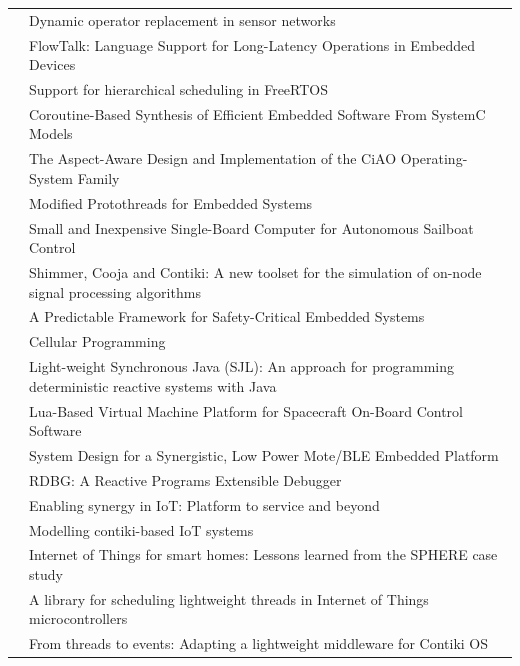 \documentclass[format=acmsmall, review=false, screen=false]{acmart}
\begin{document}
\begin{longtable}[c]{ l p{8cm} }
\cite{Strube2010} & Dynamic operator replacement in sensor networks \\
\cite{Bergel2011} & FlowTalk: Language Support for Long-Latency Operations in Embedded Devices \\
\cite{Inam2011} & Support for hierarchical scheduling in FreeRTOS \\
\cite{Liu2011} & Coroutine-Based Synthesis of Efficient Embedded Software From SystemC Models \\
\cite{Lohmann2012} & The Aspect-Aware Design and Implementation of the CiAO Operating-System Family \\
\cite{Schimpf2012b} & Modified Protothreads for Embedded Systems \\
\cite{Alvira2013} & Small and Inexpensive Single-Board Computer for Autonomous Sailboat Control \\
\cite{Kugler2013} & Shimmer, Cooja and Contiki: A new toolset for the simulation of on-node signal processing algorithms \\
\cite{Andalam2014} & A Predictable Framework for Safety-Critical Embedded Systems \\
\cite{Niebert2014} & Cellular Programming \\
\cite{Motika2015} & Light-weight Synchronous Java (SJL): An approach for programming deterministic reactive systems with Java \\
\cite{Park2015} & Lua-Based Virtual Machine Platform for Spacecraft On-Board Control Software \\
\cite{Andersen2016} & System Design for a Synergistic, Low Power Mote/BLE Embedded Platform \\
\cite{Jahier2016} & RDBG: A Reactive Programs Extensible Debugger \\
\cite{Andersen2017b} & Enabling synergy in IoT: Platform to service and beyond \\
\cite{Durmaz2017} & Modelling contiki-based IoT systems \\
\cite{Elsts2017} & Internet of Things for smart homes: Lessons learned from the SPHERE case study \\
\cite{Kalebe2017} & A library for scheduling lightweight threads in Internet of Things microcontrollers \\
\cite{Noman2017} & From threads to events: Adapting a lightweight middleware for Contiki OS \\
\hline
\end{longtable}

\fi
\end{document}
